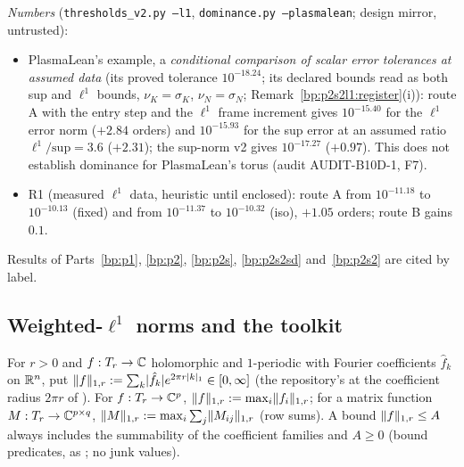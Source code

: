 \emph{Numbers} (\texttt{thresholds\_v2.py --l1}, \texttt{dominance.py --plasmalean}; design mirror, untrusted):
\begin{itemize}
\item PlasmaLean's example, a \emph{conditional comparison of scalar error tolerances at assumed data} (its proved tolerance $10^{-18.24}$;
  its declared bounds read as both sup and $\ell^1$ bounds, $\nu_K=\sigma_K$, $\nu_N=\sigma_N$; Remark~\ref{bp:p2s2l1:register}(i)): route A with the
  entry step and the $\ell^1$ frame increment gives $10^{-15.40}$ for the $\ell^1$ error norm ($+2.84$ orders) and $10^{-15.93}$ for the sup
  error at an assumed ratio $\ell^1/\text{sup}=3.6$ ($+2.31$); the sup-norm v2 gives $10^{-17.27}$ ($+0.97$). This does not establish dominance
  for PlasmaLean's torus (audit AUDIT-B10D-1, F7).
\item R1 (measured $\ell^1$ data, heuristic until enclosed): route A from $10^{-11.18}$ to $10^{-10.13}$ (fixed) and from $10^{-11.37}$ to
  $10^{-10.32}$ (iso), $+1.05$ orders; route B gains $0.1$.
\end{itemize}
Results of Parts~\ref{bp:p1}, \ref{bp:p2}, \ref{bp:p2s}, \ref{bp:p2s2sd} and~\ref{bp:p2s2} are cited by label.

\subsection{Weighted-$\ell^1$ norms and the toolkit}\label{bp:p2s2l1:sec-norms}

\begin{definition}\label{bp:p2s2l1:norms}
For $r>0$ and $f:T_r\to\mathbb{C}$ holomorphic and $1$-periodic with Fourier coefficients $\hat f_k$ on $\mathbb{R}^n$, put
$\lVert f\rVert_{1,r}:=\sum_k\lvert \hat f_k\rvert e^{2\pi r\lvert k\rvert_1}\in[0,\infty]$ (the repository's  at the coefficient radius $2\pi r$ of
). For $f:T_r\to\mathbb{C}^p$, $\lVert f\rVert_{1,r}:=\max_i\lVert f_i\rVert_{1,r}$; for a matrix function
$M:T_r\to\mathbb{C}^{p\times q}$, $\lVert M\rVert_{1,r}:=\max_i\sum_j\lVert M_{ij}\rVert_{1,r}$ (row sums). A bound $\lVert f\rVert_{1,r}\le A$ always includes the
summability of the coefficient families and $A\ge0$ (bound predicates, as ; no junk values).
\end{definition}

